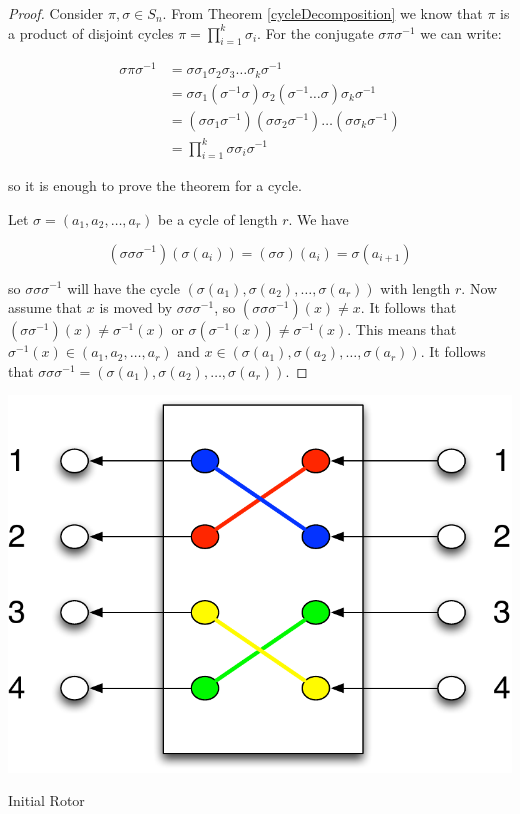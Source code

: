 \begin{proof}
Consider $\pi, \sigma \in S_n$. From Theorem \ref{cycleDecomposition} we know that $\pi$ is a product of disjoint cycles $\pi = \prod^k_{i=1} \sigma_i$. For the conjugate $\sigma \pi \sigma^{-1}$ we can write:

\begin{align*}
\sigma \pi \sigma^{-1} &= \sigma \sigma_1 \sigma_2 \sigma_3 \ldots \sigma_k \sigma^{-1} \\
&= \sigma \sigma_1 (\sigma^{-1}\sigma) \sigma_2 (\sigma^{-1} \ldots \sigma) \sigma_k \sigma^{-1} \\
&= (\sigma \sigma_1 \sigma^{-1}) (\sigma \sigma_2 \sigma^{-1}) \ldots (\sigma \sigma_k \sigma^{-1}) \\
&= \prod\limits^k_{i=1} \sigma \sigma_i \sigma^{-1}
\end{align*}

so it is enough to prove the theorem for a cycle.

Let $\sigma = (a_1, a_2, \ldots, a_r)$ be a cycle of length $r$. We have

$$
(\sigma \sigma \sigma^{-1}) (\sigma(a_i)) = (\sigma \sigma) (a_i) = \sigma(a_{i+1}) 
$$

so $\sigma \sigma \sigma^{-1}$ will have the cycle $(\sigma(a_1), \sigma(a_2), \ldots, \sigma(a_r))$ with length $r$. Now assume that $x$ is moved by $\sigma \sigma \sigma^{-1}$, so $(\sigma \sigma \sigma^{-1})(x) \neq x$. It follows that $(\sigma \sigma^{-1})(x) \neq \sigma^{-1} (x)$ or $\sigma (\sigma^{-1} (x)) \neq \sigma^{-1} (x)$. This means that $\sigma^{-1} (x) \in (a_1, a_2, \ldots, a_r)$ and $x \in (\sigma(a_1), \sigma(a_2), \ldots, \sigma(a_r))$. It follows that $\sigma \sigma \sigma^{-1} = (\sigma(a_1), \sigma(a_2), \ldots, \sigma(a_r))$.

\end{proof}

\begin{marginfigure}[0.5in]
\includegraphics[scale=0.4]{rotorMotionBefore.pdf}
\caption{Initial Rotor}
\label{fig:rotorMotionBefore}
\end{marginfigure}

